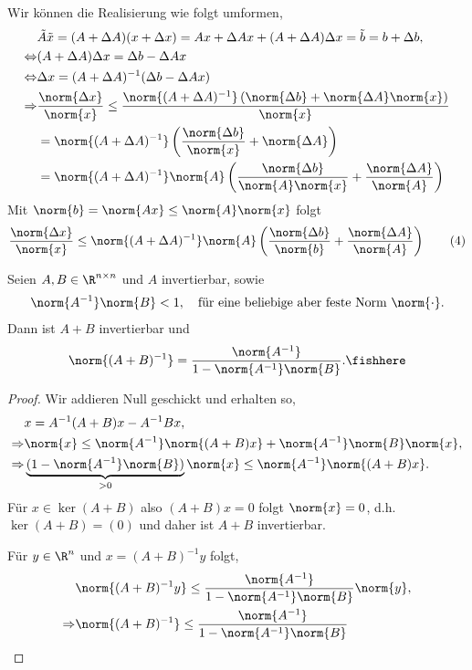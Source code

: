 Wir können die Realisierung wie folgt umformen,
\begin{align*}
&\tilde{A}\tilde{x} = (A+\Delta A)(x+\Delta x) = Ax+\Delta Ax + (A+\Delta
A)\Delta x = \tilde{b} = b+\Delta b,\\
\Leftrightarrow & (A+\Delta A)\Delta x = \Delta b - \Delta A x\\
\Leftrightarrow & \Delta x = (A+\Delta A)^{-1}(\Delta b - \Delta Ax)\\
\Rightarrow &\frac{\norm{\Delta x}}{\norm{x}} \le \frac{\norm{(A+\Delta
A)^{-1}}\left(\norm{\Delta b}+\norm{\Delta A}\norm{x}\right)}{\norm{x}}\\
&= \norm{(A+\Delta A)^{-1}}\left(\frac{\norm{\Delta b}}{\norm{x}} +
\norm{\Delta A}\right) \\
&= \norm{(A+\Delta A)^{-1}}\norm{A}\left(\frac{\norm{\Delta
b}}{\norm{A}\norm{x}} + \frac{\norm{\Delta A}}{\norm{A}}\right)
\end{align*}
Mit $\norm{b} = \norm{Ax} \le \norm{A}\norm{x}$ folgt
\begin{align*}
\frac{\norm{\Delta x}}{\norm{x}}
\le \norm{(A+\Delta A)^{-1}}\norm{A}\left(\frac{\norm{\Delta
b}}{\norm{b}} + \frac{\norm{\Delta A}}{\norm{A}}\right)\tag{4}
\end{align*}

\begin{prop}
\label{prop:2.11}
Seien $A,B\in\R^{n\times n}$ und $A$ invertierbar, sowie
\begin{align*}
\norm{A^{-1}}\norm{B} < 1,\quad\text{für eine beliebige aber feste Norm
$\norm{\cdot}$}.
\end{align*}
Dann ist $A+B$ invertierbar und
\begin{align*}
\norm{(A+B)^{-1}} = \frac{\norm{A^{-1}}}{1-\norm{A^{-1}}\norm{B}}.\fishhere
\end{align*}
\end{prop}
\begin{proof}
Wir addieren Null geschickt und erhalten so,
\begin{align*}
&x = A^{-1}(A+B)x - A^{-1}Bx,\\
\Rightarrow & \norm{x} \le \norm{A^{-1}}\norm{(A+B)x} +
\norm{A^{-1}}\norm{B}\norm{x},\\
\Rightarrow & \underbrace{(1-\norm{A^{-1}}\norm{B})}_{>0}\norm{x} \le
\norm{A^{-1}}\norm{(A+B)x}.
\end{align*}
Für $x\in\ker(A+B)$ also $(A+B)x = 0$ folgt $\norm{x}=0$, d.h. $\ker(A+B)=(0)$
und daher ist $A+B$ invertierbar.

Für $y\in\R^n$ und $x=(A+B)^{-1}y$ folgt,
\begin{align*}
&\norm{(A+B)^{-1}y} \le \frac{\norm{A^{-1}}}{1-\norm{A^{-1}}\norm{B}}\norm{y},\\
\Rightarrow & \norm{(A+B)^{-1}} \le
\frac{\norm{A^{-1}}}{1-\norm{A^{-1}}\norm{B}}\qedhere
\end{align*}
\end{proof}

